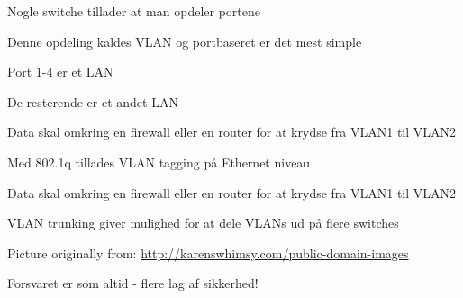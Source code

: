 \documentclass[Screen16to9,17pt]{foils}
\begin{document}


\begin{list1}
\item Nogle switche tillader at man opdeler portene
\item Denne opdeling kaldes VLAN og portbaseret er det mest simple
\item Port 1-4 er et LAN
\item De resterende er et andet LAN
\item Data skal omkring en firewall eller en router for at krydse fra VLAN1 til VLAN2
\end{list1}



\begin{list1}
\item Med 802.1q tillades VLAN tagging på Ethernet niveau
\item Data skal omkring en firewall eller en router for at krydse fra VLAN1 til VLAN2
\item VLAN trunking giver mulighed for at dele VLANs ud på flere switches
\end{list1}



\centerline{Picture originally from: \url{http://karenswhimsy.com/public-domain-images}}



\centerline{Forsvaret er som altid - flere lag af sikkerhed! }




\end{document}
